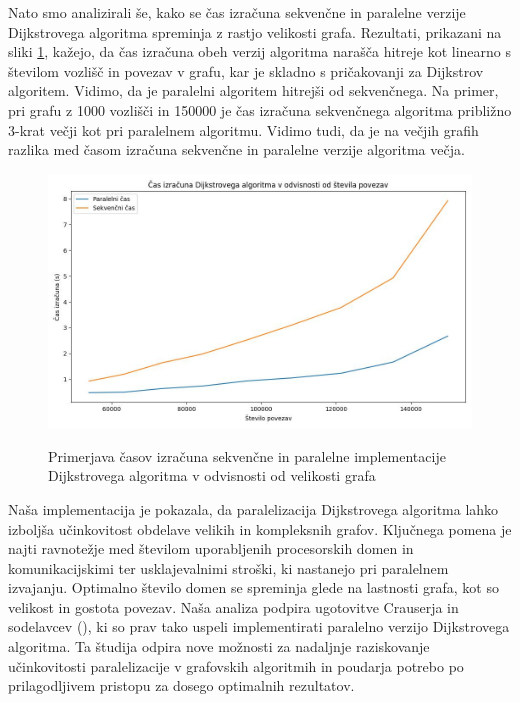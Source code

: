 \documentclass[mat1, tisk]{fmfdelo}
\begin{document}
Nato smo analizirali še, kako se čas izračuna sekvenčne in paralelne verzije Dijkstrovega algoritma spreminja z rastjo
velikosti grafa. Rezultati, prikazani na sliki \ref{fig:dijkstra_calculation_time_by_graph_size}, kažejo, da čas izračuna
obeh verzij algoritma narašča hitreje kot linearno s številom vozlišč in povezav v grafu, kar je skladno s pričakovanji
za Dijkstrov algoritem. Vidimo, da je paralelni algoritem hitrejši od sekvenčnega. Na primer, pri grafu z 1000 vozlišči
in 150000 je čas izračuna sekvenčnega algoritma približno 3-krat večji kot pri paralelnem algoritmu. Vidimo tudi, da je
na večjih grafih razlika med časom izračuna sekvenčne in paralelne verzije algoritma večja.  

\begin{figure}[h!]
  \centering
  \caption{Primerjava časov izračuna sekvenčne in paralelne implementacije Dijkstrovega algoritma v odvisnosti od velikosti grafa}
  \includegraphics[width=15cm]{slike/dijkstra_v_odvisnosti_od_velikosti_grafa.jpg}
  \label{fig:dijkstra_calculation_time_by_graph_size}
\end{figure}

Naša implementacija je pokazala, da paralelizacija Dijkstrovega algoritma lahko izboljša učinkovitost obdelave velikih
in kompleksnih grafov. Ključnega pomena je najti ravnotežje med številom uporabljenih procesorskih domen in
komunikacijskimi ter usklajevalnimi stroški, ki nastanejo pri paralelnem izvajanju. Optimalno število domen se spreminja
glede na lastnosti grafa, kot so velikost in gostota povezav. Naša analiza podpira ugotovitve Crauserja in
sodelavcev (\cite{crauser1998parallelizing}), ki so prav tako uspeli implementirati paralelno verzijo Dijkstrovega algoritma.
Ta študija odpira nove možnosti za nadaljnje raziskovanje učinkovitosti paralelizacije v grafovskih algoritmih in
poudarja potrebo po prilagodljivem pristopu za dosego optimalnih rezultatov.
\end{document}
